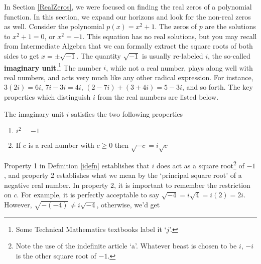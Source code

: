 

\setcounter{footnote}{0}

\label{ComplexZeros}

In Section \ref{RealZeros}, we were focused on finding the real zeros of a polynomial function.  In this section, we expand our horizons and look for the non-real zeros as well.  Consider the polynomial $p(x) = x^2+1$.  The zeros of $p$ are the solutions to $x^2+1=0$, or $x^2=-1$.  This equation has no real solutions, but you may recall from Intermediate Algebra that we can formally extract the square roots of both sides to get  $x = \pm \sqrt{-1}$.  The quantity $\sqrt{-1}$ is usually re-labeled $i$, the so-called   \textbf{imaginary unit}.\footnote{Some Technical Mathematics textbooks label it `$j$'.}  The number $i$, while not a real number, plays along well with real numbers, and acts very much like any other radical expression.  For instance, $3(2i) = 6i$, $7i-3i = 4i$, $(2-7i) + (3 + 4i) = 5-3i$, and so forth.  The key properties which distinguish $i$ from the real numbers are listed below.

\medskip

\colorbox{ResultColor}{\bbm
\begin{defn} \label{idefn} The imaginary unit $i$ satisfies the two following properties

\begin{enumerate}

\item  $i^2 = -1$

\item  If $c$ is a real number with $c \geq 0$ then $\sqrt{-c} = i \sqrt{c}$

\end{enumerate}

\end{defn}
\ebm}

\medskip

Property 1 in Definition \ref{idefn} establishes that $i$ does act as a square root\footnote{Note the use of the indefinite article `a'.  Whatever beast is chosen to be $i$, $-i$ is the other square root of $-1$.} of $-1$, and property 2 establishes what we mean by the `principal square root' of a negative real number.  In property 2, it is important to remember the restriction on $c$.  For example, it is perfectly acceptable to say  $\sqrt{-4} = i \sqrt{4} = i(2) = 2i$. However, $\sqrt{-(-4)} \neq i \sqrt{-4}$, otherwise, we'd get

